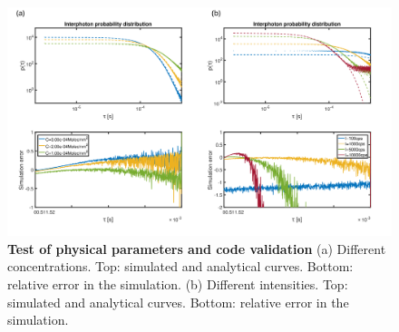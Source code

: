  \begin{figure}
 \centering
 \includegraphics[width=\textwidth]{Theta_physical_test}%
 \caption{\textbf{Test of physical parameters and code validation} 
(a) Different concentrations. Top: simulated and analytical curves. Bottom: relative error in the simulation.
(b) Different intensities. Top: simulated and analytical curves. Bottom: relative error in the simulation.
\label{fg:Theta_physical_test}}
 \end{figure}